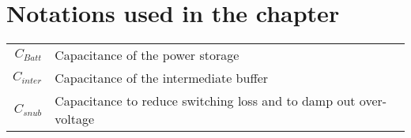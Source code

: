 \newpage
\section{Notations used in the chapter}
		
  \begin{scriptsize}
\begin{tabularx}{\textwidth}{r|X}





$C_{Batt}$ 												& Capacitance of the power storage\\
$C_{inter}$ 												& Capacitance of the intermediate buffer\\
$C_{snub}$ 												& Capacitance to reduce switching loss and to damp out over-voltage\\

\end{tabularx}
\end{scriptsize}
